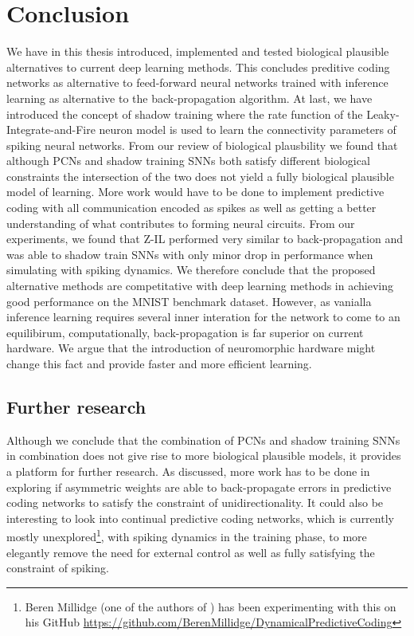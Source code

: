 \documentclass[a4paper,11pt]{article} %
\begin{document}
\section{Conclusion}
We have in this thesis introduced, implemented and tested biological plausible alternatives to current deep learning methods. This concludes preditive coding networks as alternative to feed-forward neural networks trained with inference learning as alternative to the back-propagation algorithm. At last, we have introduced the concept of shadow training where the rate function of the Leaky-Integrate-and-Fire neuron model is used to learn the connectivity parameters of spiking neural networks. From our review of biological plausbility we found that although PCNs and shadow training SNNs both satisfy different biological constraints the intersection of the two does not yield a fully biological plausible model of learning. More work would have to be done to implement predictive coding with all communication encoded as spikes as well as getting a better understanding of what contributes to forming neural circuits. From our experiments, we found that Z-IL performed very similar to back-propagation and was able to shadow train SNNs with only minor drop in performance when simulating with spiking dynamics. We therefore conclude that the proposed alternative methods are competitative with deep learning methods in achieving good performance on the MNIST benchmark dataset. However, as vanialla inference learning requires several inner interation for the network to come to an equilibirum, computationally, back-propagation is far superior on current hardware. We argue that the introduction of neuromorphic hardware might change this fact and provide faster and more efficient learning. 

\subsection{Further research}
Although we conclude that the combination of PCNs and shadow training SNNs in combination does not give rise to more biological plausible models, it provides a platform for further research. As discussed, more work has to be done in exploring if asymmetric weights are able to back-propagate errors in predictive coding networks to satisfy the constraint of unidirectionality. It could also be interesting to look into continual predictive coding networks, which is currently mostly unexplored\footnote{
  Beren Millidge (one of the authors of \cite{milladge2020predictive}) has been experimenting with this on his GitHub \href{https://github.com/BerenMillidge/DynamicalPredictiveCoding}{https://github.com/BerenMillidge/DynamicalPredictiveCoding}
}, with spiking dynamics in the training phase, to more elegantly remove the need for external control as well as fully satisfying the constraint of spiking. 
\end{document}
